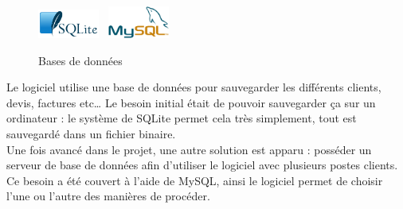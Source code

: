 \begin{figure}
\begin{center}
\includegraphics[width=0.18\textwidth]{../beamer/logos/sqlite.png}~
\includegraphics[width=0.18\textwidth]{../beamer/logos/mysql.png}
\end{center}
\caption{Bases de données}
\end{figure}
Le logiciel utilise une base de données pour sauvegarder les différents clients, devis, factures etc… Le besoin initial était de pouvoir
sauvegarder ça sur un ordinateur : le système de SQLite permet cela très simplement, tout est sauvegardé dans un fichier binaire.\\ Une fois
avancé dans le projet, une autre solution est apparu : posséder un serveur de base de données afin d'utiliser le logiciel avec plusieurs
postes clients. Ce besoin a été couvert à l'aide de MySQL, ainsi le logiciel permet de choisir l'une ou l'autre des manières de procéder.


